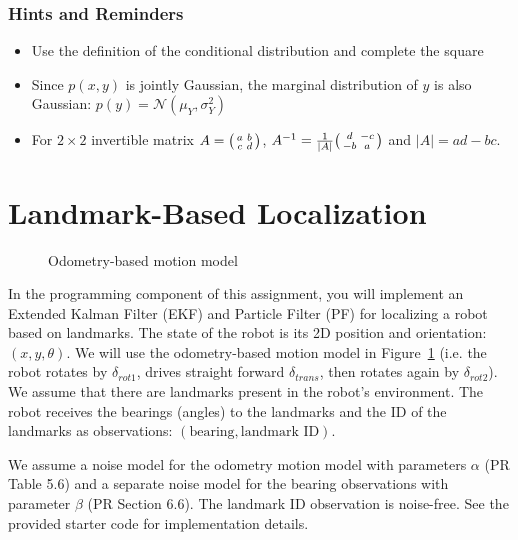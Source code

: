 \documentclass{article}
\newcommand{\?}{\stackrel{?}{=}}
\begin{document}
\subsubsection*{Hints and Reminders}
\begin{itemize}
\item Use the definition of the conditional distribution and complete the square
\item Since $p(x, y)$ is jointly Gaussian, the marginal distribution of $y$ is
  also Gaussian: $p(y) = \mathcal{N}(\mu_{Y}, \sigma_{Y}^2)$
\item For $2 \times 2$ invertible matrix
  $A = \begin{psmallmatrix} a & b \\ c & d \end{psmallmatrix}$,
  $A^{-1} = \frac{1}{|A|} \begin{psmallmatrix} d & -c \\ -b &
    a \end{psmallmatrix}$ and $|A| = ad - bc$.
\end{itemize}


\section*{Landmark-Based Localization}

\begin{figure}[!h]
\centering

\caption{Odometry-based motion model}
\label{fig:motion-model}
\end{figure}

In the programming component of this assignment, you will implement an Extended Kalman Filter (EKF) and Particle Filter (PF) for localizing a robot based on landmarks.
The state of the robot is its 2D position and orientation: $(x, y, \theta)$.
We will use the odometry-based motion model in Figure~\ref{fig:motion-model}
(i.e. the robot rotates by $\delta_{rot1}$, drives straight forward $\delta_{trans}$, then rotates again by $\delta_{rot2}$).
We assume that there are landmarks present in the robot's environment.
The robot receives the bearings (angles) to the landmarks and the ID of the landmarks as observations: $(\text{bearing}, \text{landmark ID})$.

We assume a noise model for the odometry motion model with parameters $\alpha$ (PR Table 5.6) and a separate noise model for the bearing observations with parameter $\beta$ (PR Section 6.6).
The landmark ID observation is noise-free.
See the provided starter code for implementation details.
\end{document}
